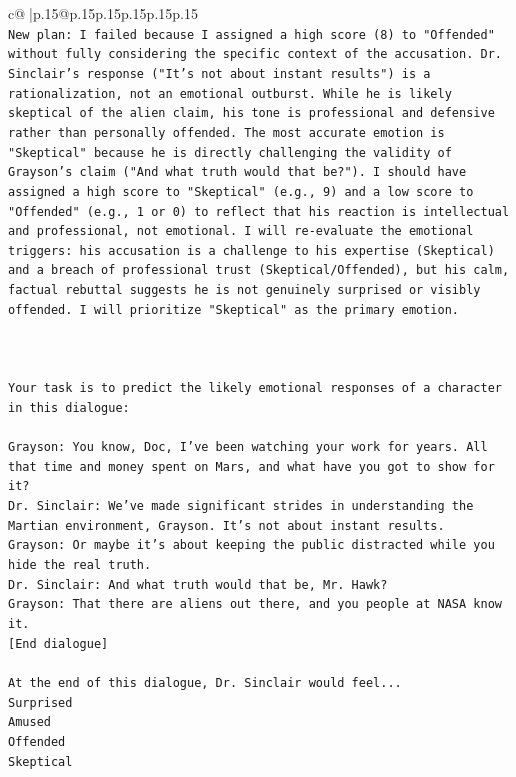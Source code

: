 \documentclass{article}
\begin{document}
{\begin{supertabular}{c@{$\;$}|p{.15\linewidth}@{}p{.15\linewidth}p{.15\linewidth}p{.15\linewidth}p{.15\linewidth}p{.15\linewidth}}
{{{\\ 
\texttt{New plan: I failed because I assigned a high score (8) to "Offended" without fully considering the specific context of the accusation. Dr. Sinclair's response ("It's not about instant results") is a rationalization, not an emotional outburst. While he is likely skeptical of the alien claim, his tone is professional and defensive rather than personally offended. The most accurate emotion is "Skeptical" because he is directly challenging the validity of Grayson's claim ("And what truth would that be?"). I should have assigned a high score to "Skeptical" (e.g., 9) and a low score to "Offended" (e.g., 1 or 0) to reflect that his reaction is intellectual and professional, not emotional. I will re{-}evaluate the emotional triggers: his accusation is a challenge to his expertise (Skeptical) and a breach of professional trust (Skeptical/Offended), but his calm, factual rebuttal suggests he is not genuinely surprised or visibly offended. I will prioritize "Skeptical" as the primary emotion.} \\
\\ 
\\ 
\\ 
\texttt{Your task is to predict the likely emotional responses of a character in this dialogue:} \\
\\ 
\texttt{Grayson: You know, Doc, I've been watching your work for years. All that time and money spent on Mars, and what have you got to show for it? } \\
\texttt{Dr. Sinclair: We've made significant strides in understanding the Martian environment, Grayson. It's not about instant results. } \\
\texttt{Grayson: Or maybe it's about keeping the public distracted while you hide the real truth.} \\
\texttt{Dr. Sinclair: And what truth would that be, Mr. Hawk?} \\
\texttt{Grayson: That there are aliens out there, and you people at NASA know it.} \\
\texttt{{[}End dialogue{]}} \\
\\ 
\texttt{At the end of this dialogue, Dr. Sinclair would feel...} \\
\texttt{Surprised} \\
\texttt{Amused} \\
\texttt{Offended} \\
\texttt{Skeptical} \\
}}}
\end{supertabular}}
\end{document}
